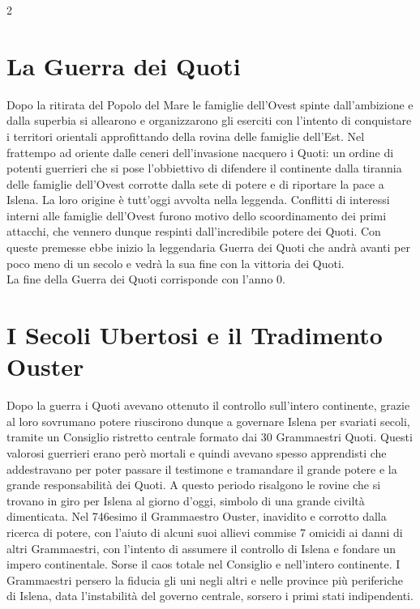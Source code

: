 \documentclass[10pt, a4paper]{report}
\begin{document}
\begin{multicols}{2}
\section*{La Guerra dei Quoti}
Dopo la ritirata del Popolo del Mare le famiglie dell’Ovest spinte dall’ambizione e dalla superbia si allearono e organizzarono gli eserciti con l’intento di conquistare i territori orientali approfittando della rovina delle famiglie dell’Est. Nel frattempo ad oriente dalle ceneri dell’invasione nacquero i Quoti: un ordine di potenti guerrieri che si pose l’obbiettivo di difendere il continente dalla tirannia delle famiglie dell’Ovest corrotte dalla sete di potere e di riportare la pace a Islena. La loro origine è tutt’oggi avvolta nella leggenda. Conflitti di interessi interni alle famiglie dell’Ovest furono motivo dello scoordinamento dei primi attacchi, che vennero dunque respinti dall’incredibile potere dei Quoti. Con queste premesse ebbe inizio la leggendaria Guerra dei Quoti che andrà avanti per poco meno di un secolo e vedrà la sua fine con la vittoria dei Quoti.\\
La fine della Guerra dei Quoti corrisponde con l’anno 0.
\section*{I Secoli Ubertosi e il Tradimento Ouster}
Dopo la guerra i Quoti avevano ottenuto il controllo sull’intero continente, grazie al loro sovrumano potere riuscirono dunque a governare Islena per svariati secoli, tramite un Consiglio ristretto centrale formato dai 30 Grammaestri Quoti. Questi valorosi guerrieri erano però mortali e quindi avevano spesso apprendisti che addestravano per poter passare il testimone e tramandare il grande potere e la grande responsabilità dei Quoti. A questo periodo risalgono le rovine che si trovano in giro per Islena al giorno d’oggi, simbolo di una grande civiltà dimenticata. Nel 746esimo il Grammaestro Ouster, inavidito e corrotto dalla ricerca di potere, con l’aiuto di alcuni suoi allievi commise 7 omicidi ai danni di altri Grammaestri, con l’intento di assumere il controllo di Islena e fondare un impero continentale. Sorse il caos totale nel Consiglio e nell’intero continente. I Grammaestri persero la fiducia gli uni negli altri e nelle province più periferiche di Islena, data l’instabilità del governo centrale, sorsero i primi stati indipendenti.

\end{multicols}
\end{document}
